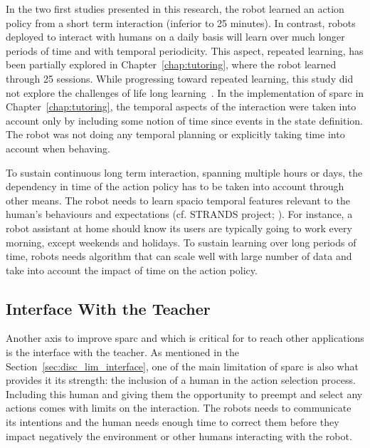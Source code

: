
In the two first studies presented in this research, the robot learned an action policy from a short term interaction (inferior to 25 minutes). In contrast, robots deployed to interact with humans on a daily basis will learn over much longer periods of time and with temporal periodicity. This aspect, repeated learning, has been partially explored in Chapter~\ref{chap:tutoring}, where the robot learned through 25 sessions. While progressing toward repeated learning, this study did not explore the challenges of life long learning~\citep{thrun1995lifelong}. In the implementation of \gls{sparc} in Chapter~\ref{chap:tutoring}, the temporal aspects of the interaction were taken into account only by including some notion of time since events in the state definition. The robot was not doing any temporal planning or explicitly taking time into account when behaving.%

To sustain continuous long term interaction, spanning multiple hours or days, the dependency in time of the action policy has to be taken into account through other means. The robot needs to learn spacio temporal features relevant to the human's behaviours and expectations (cf. STRANDS project; \citealt{hawes2017strands}). For instance, a robot assistant at home should know its users are typically going to work every morning, except weekends and holidays. To sustain learning over long periods of time, robots needs algorithm that can scale well with large number of data and take into account the impact of time on the action policy.

\subsection{Interface With the Teacher}

Another axis to improve \gls{sparc} and which is critical for to reach other applications is the interface with the teacher. As mentioned in the Section~\ref{sec:disc_lim_interface}, one of the main limitation of \gls{sparc} is also what provides it its strength: the inclusion of a human in the action selection process. Including this human and giving them the opportunity to preempt and select any actions comes with limits on the interaction. The robots needs to communicate its intentions and the human needs enough time to correct them before they impact negatively the environment or other humans interacting with the robot. %

